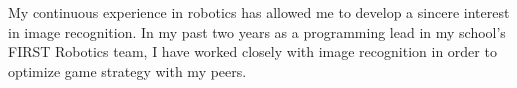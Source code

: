



My continuous experience in robotics has allowed me 
to develop a sincere interest in image recognition. 
In my past two years as a programming lead in my 
school’s FIRST Robotics team, I have worked closely
 with image recognition in order to optimize game
  strategy with my peers.